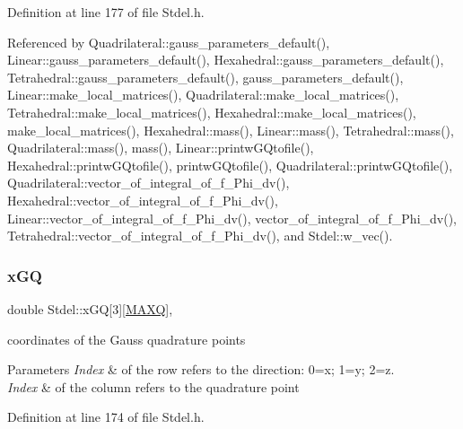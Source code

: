 Definition at line 177 of file Stdel.\+h.



Referenced by Quadrilateral\+::gauss\+\_\+parameters\+\_\+default(), Linear\+::gauss\+\_\+parameters\+\_\+default(), Hexahedral\+::gauss\+\_\+parameters\+\_\+default(), Tetrahedral\+::gauss\+\_\+parameters\+\_\+default(), gauss\+\_\+parameters\+\_\+default(), Linear\+::make\+\_\+local\+\_\+matrices(), Quadrilateral\+::make\+\_\+local\+\_\+matrices(), Tetrahedral\+::make\+\_\+local\+\_\+matrices(), Hexahedral\+::make\+\_\+local\+\_\+matrices(), make\+\_\+local\+\_\+matrices(), Hexahedral\+::mass(), Linear\+::mass(), Tetrahedral\+::mass(), Quadrilateral\+::mass(), mass(), Linear\+::printw\+G\+Qtofile(), Hexahedral\+::printw\+G\+Qtofile(), printw\+G\+Qtofile(), Quadrilateral\+::printw\+G\+Qtofile(), Quadrilateral\+::vector\+\_\+of\+\_\+integral\+\_\+of\+\_\+f\+\_\+\+Phi\+\_\+dv(), Hexahedral\+::vector\+\_\+of\+\_\+integral\+\_\+of\+\_\+f\+\_\+\+Phi\+\_\+dv(), Linear\+::vector\+\_\+of\+\_\+integral\+\_\+of\+\_\+f\+\_\+\+Phi\+\_\+dv(), vector\+\_\+of\+\_\+integral\+\_\+of\+\_\+f\+\_\+\+Phi\+\_\+dv(), Tetrahedral\+::vector\+\_\+of\+\_\+integral\+\_\+of\+\_\+f\+\_\+\+Phi\+\_\+dv(), and Stdel\+::w\+\_\+vec().

\mbox{\label{classStdel_adedcb4d4faa12adf348054780a3b2c1a}} 
\subsubsection{\texorpdfstring{x\+GQ}{xGQ}}
{\footnotesize\ttfamily double Stdel\+::x\+GQ\mbox{[}3\mbox{]}\mbox{[}\hyperlink{MyOptions_8h_af708e94d886ba3f59582612949cac702}{M\+A\+XQ}\mbox{]}\hspace{0.3cm}{\ttfamily [protected]}, {\ttfamily [inherited]}}

coordinates of the Gauss quadrature points 
\begin{DoxyParams}{Parameters}
{\em Index} & of the row refers to the direction\+: 0=x; 1=y; 2=z. \\
\hline
{\em Index} & of the column refers to the quadrature point \\
\hline
\end{DoxyParams}


Definition at line 174 of file Stdel.\+h.



